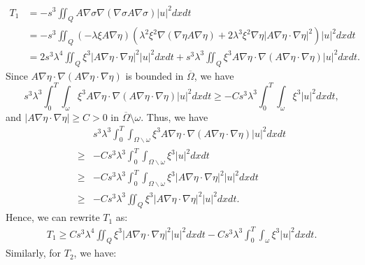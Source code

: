 \documentclass[9pt,reqno]{amsart}
\theoremstyle{plain}
\numberwithin{equation}{section}
\numberwithin{theorem}{section}
\def\Om{\Omega}
\def\Om{\Omega}
\begin{document}
	\begin{equation}
		\begin{aligned}
			T_1
			&=-s^3 \iint_Q A \nabla \sigma \nabla(\nabla \sigma A \nabla \sigma)|u|^2 dx  dt\\
			&=-s^3 \iint_Q  \left( -\lambda \xi A \nabla \eta \right) \left( \lambda^2\xi^2 \nabla(\nabla \eta A \nabla \eta) + 2\lambda^3\xi^2 \nabla \eta \left| A \nabla \eta \cdot \nabla \eta \right| ^2\right) |u|^2 dx  dt\\
			&=2s^3 \lambda^4 \iint_Q \xi^3\left|A \nabla \eta \cdot \nabla \eta \right|^2|u|^2 dx  dt
			+ s^3 \lambda^3 \iint_Q \xi^3 A\nabla \eta \cdot \nabla(A\nabla \eta \cdot \nabla\eta)|u|^2 dx  dt.
		\end{aligned}
	\end{equation}
	Since $A\nabla \eta \cdot\nabla(A\nabla \eta \cdot \nabla\eta)$ is bounded in $\overline{\Omega}$, we have
	$$
	s^3 \lambda^3 \int_{0}^{T}\int_{\omega} \xi^3 A\nabla \eta \cdot \nabla(A\nabla \eta \cdot \nabla\eta)|u|^2 dx  dt \ge -C s^3 \lambda^3 \int_{0}^{T}\int_{\omega} \xi^3 |u|^2 dx  dt,
	$$
	and $|A \nabla \eta \cdot \nabla \eta|\ge C>0$ in $\overline{\Omega} \setminus \omega$. Thus, we have
	$$
	\begin{aligned}
		&s^3 \lambda^3 \int_{0}^{T}\int_{\Om\backslash \omega} \xi^3 A\nabla \eta \cdot \nabla(A\nabla \eta \cdot \nabla\eta)|u|^2 dx  dt\\
		\ge& -C s^3 \lambda^3 \int_{0}^{T}\int_{\Om\backslash \omega} \xi^3 |u|^2 dx  dt\\
		\ge&
		-C s^3 \lambda^3 \int_{0}^{T}\int_{\Om\backslash \omega} \xi^3 \left|A \nabla \eta \cdot \nabla \eta \right|^2 |u|^2 dx  dt\\
		\ge&
		-C s^3 \lambda^3 \iint_{Q} \xi^3 \left|A \nabla \eta \cdot \nabla \eta \right|^2 |u|^2 dx  dt.
	\end{aligned}
	$$
	Hence, we can rewrite $T_1$ as:
	\begin{equation}\label{T1}
		\begin{aligned}
			T_1
			\geq C s^3 \lambda^4 \iint_Q \xi^3\left|A \nabla \eta \cdot \nabla \eta \right|^2|u|^2 dx  dt-C s^3 \lambda^3\int_0^T \int_{\omega} \xi^3|u|^2 dx  dt.
		\end{aligned}
	\end{equation}
	Similarly, for $T_2$, we have:
\end{document}
